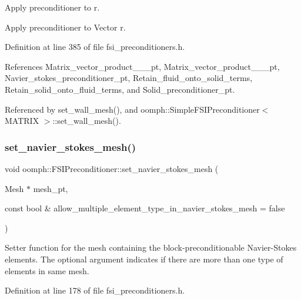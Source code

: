 Apply preconditioner to r. 

Apply preconditioner to Vector r. 

Definition at line 385 of file fsi\+\_\+preconditioners.\+h.



References Matrix\+\_\+vector\+\_\+product\+\_\+\_\+\_\+pt, Matrix\+\_\+vector\+\_\+product\+\_\+\_\+\_\+pt, Navier\+\_\+stokes\+\_\+preconditioner\+\_\+pt, Retain\+\_\+fluid\+\_\+onto\+\_\+solid\+\_\+terms, Retain\+\_\+solid\+\_\+onto\+\_\+fluid\+\_\+terms, and Solid\+\_\+preconditioner\+\_\+pt.



Referenced by set\+\_\+wall\+\_\+mesh(), and oomph\+::\+Simple\+F\+S\+I\+Preconditioner$<$ M\+A\+T\+R\+I\+X $>$\+::set\+\_\+wall\+\_\+mesh().

\mbox{\label{classoomph_1_1FSIPreconditioner_a5d70612246bd08bec6c7b373da5e9c80}} 
\subsubsection{\texorpdfstring{set\+\_\+navier\+\_\+stokes\+\_\+mesh()}{set\_navier\_stokes\_mesh()}}
{\footnotesize\ttfamily void oomph\+::\+F\+S\+I\+Preconditioner\+::set\+\_\+navier\+\_\+stokes\+\_\+mesh (\begin{DoxyParamCaption}\item[{Mesh $\ast$}]{mesh\+\_\+pt,  }\item[{const bool \&}]{allow\+\_\+multiple\+\_\+element\+\_\+type\+\_\+in\+\_\+navier\+\_\+stokes\+\_\+mesh = {\ttfamily false} }\end{DoxyParamCaption})\hspace{0.3cm}{\ttfamily [inline]}}



Setter function for the mesh containing the block-\/preconditionable Navier-\/\+Stokes elements. The optional argument indicates if there are more than one type of elements in same mesh. 



Definition at line 178 of file fsi\+\_\+preconditioners.\+h.



